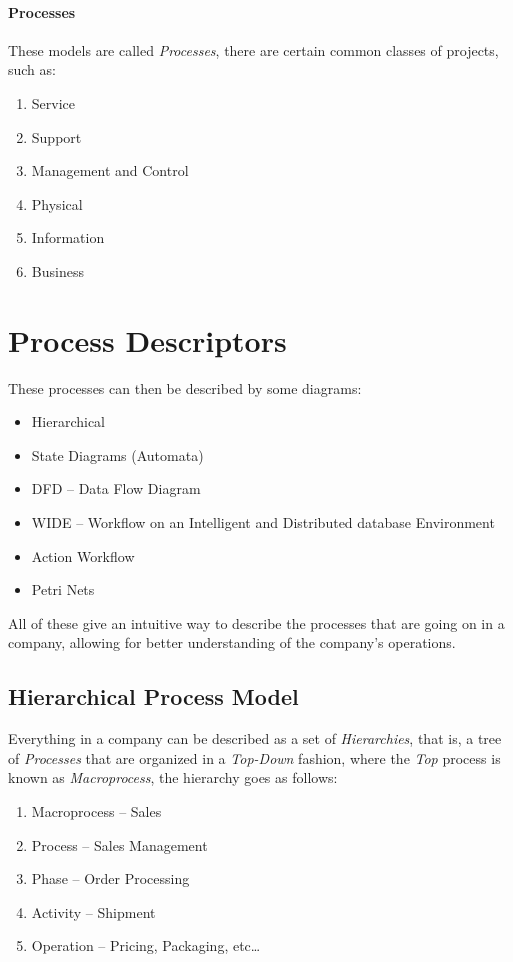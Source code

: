 \documentclass[openright, twoside, twocolumn]{report}
\begin{document}
    \paragraph{Processes}
    These models are called \emph{Processes}, there are certain common classes of projects, such as:

    \begin{enumerate}
      \item Service
      \item Support
      \item Management and Control
      \item Physical
      \item Information
      \item Business
    \end{enumerate}

    \section{Process Descriptors}

    These processes can then be described by some diagrams:

    \begin{itemize}
      \item Hierarchical
      \item State Diagrams (Automata)
      \item DFD -- Data Flow Diagram
      \item WIDE -- Workflow on an Intelligent and Distributed database Environment
      \item Action Workflow
      \item Petri Nets
    \end{itemize}

    All of these give an intuitive way to describe the processes that are going on in a company, allowing for better understanding of the company's operations.

    \subsection{Hierarchical Process Model}

    Everything in a company can be described as a set of \emph{Hierarchies}, that is, a tree of
    \emph{Processes} that are organized in a \emph{Top-Down} fashion, where the \emph{Top}
    process is known as \emph{Macroprocess}, the hierarchy goes as follows:

    \begin{enumerate}
      \item Macroprocess -- Sales
      \item Process -- Sales Management
      \item Phase -- Order Processing
      \item Activity -- Shipment
      \item Operation -- Pricing, Packaging, etc\dots
    \end{enumerate}
\end{document}
